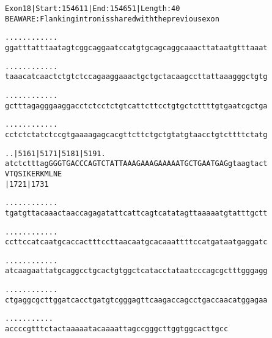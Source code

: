 \documentclass{article}
\begin{document}
\begin{alltt}
Exon 18 | Start: 154611 | End: 154651 | Length: 40
BE AWARE: Flanking intron is shared with the previous exon

.    .    .    .    .    .    .    .    .    .    .    .    
ggatttatttaatagtcggcaggaatccatgtgcagcaggcaaacttataatgtttaaat

.    .    .    .    .    .    .    .    .    .    .    .    
taaacatcaactctgtctccagaaggaaactgctgctacaagccttattaaagggctgtg

.    .    .    .    .    .    .    .    .    .    .    .    
gctttagagggaaggacctctcctctgtcattcttcctgtgctcttttgtgaatcgctga

.    .    .    .    .    .    .    .    .    .    .    .    
cctctctatctccgtgaaaagagcacgttcttctgctgtatgtaacctgtcttttctatg

.    .            |5161     |5171     |5181     |5191  .    
atctctttagGGGTGACCCAGTCTATTAAAGAAAGAAAAATGCTGAATGAGgtaagtact
            V  T  Q  S  I  K  E  R  K  M  L  N  E           
                  |1721                         |1731       

.    .    .    .    .    .    .    .    .    .    .    .    
tgatgttacaaactaaccagagatattcattcagtcatatagttaaaaatgtatttgctt

.    .    .    .    .    .    .    .    .    .    .    .    
ccttccatcaatgcaccactttccttaacaatgcacaaattttccatgataatgaggatc

.    .    .    .    .    .    .    .    .    .    .    .    
atcaagaattatgcaggcctgcactgtggctcatacctataatcccagcgctttgggagg

.    .    .    .    .    .    .    .    .    .    .    .    
ctgaggcgcttggatcacctgatgtcgggagttcaagaccagcctgaccaacatggagaa

.    .    .    .    .    .    .    .    .    .    .
accccgtttctactaaaaatacaaaattagccgggcttggtggcacttgcc
\end{alltt}
\newpage
\end{document}
